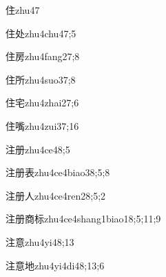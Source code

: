 \begin{verbete}{住}{zhu4}{7}
\end{verbete}

\begin{verbete}{住处}{zhu4chu4}{7;5}
\end{verbete}

\begin{verbete}{住房}{zhu4fang2}{7;8}
\end{verbete}

\begin{verbete}{住所}{zhu4suo3}{7;8}
\end{verbete}

\begin{verbete}{住宅}{zhu4zhai2}{7;6}
\end{verbete}

\begin{verbete}{住嘴}{zhu4zui3}{7;16}
\end{verbete}

\begin{verbete}{注册}{zhu4ce4}{8;5}
\end{verbete}

\begin{verbete}{注册表}{zhu4ce4biao3}{8;5;8}
\end{verbete}

\begin{verbete}{注册人}{zhu4ce4ren2}{8;5;2}
\end{verbete}

\begin{verbete}{注册商标}{zhu4ce4shang1biao1}{8;5;11;9}
\end{verbete}

\begin{verbete}{注意}{zhu4yi4}{8;13}
\end{verbete}

\begin{verbete}{注意地}{zhu4yi4di4}{8;13;6}
\end{verbete}

